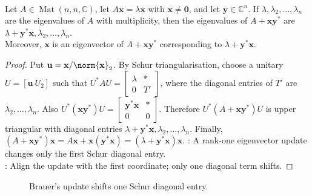 \begin{theorem} \label{thm:brauer-rank-one-eigenvalue-shift} \\
Let $A\in\operatorname{Mat}(n,n,\mathbb{C})$, let $A\mathbf{x}=\lambda\mathbf{x}$ with $\mathbf{x}\neq\mathbf{0}$, and let $\mathbf{y}\in\mathbb{C}^n$. If $\lambda,\lambda_2,\ldots,\lambda_n$ are the eigenvalues of $A$ with multiplicity, then the eigenvalues of $A+\mathbf{x}\mathbf{y}^*$ are $\lambda+\mathbf{y}^*\mathbf{x},\lambda_2,\ldots,\lambda_n$.\\
Moreover, $\mathbf{x}$ is an eigenvector of $A+\mathbf{x}\mathbf{y}^*$ corresponding to $\lambda+\mathbf{y}^*\mathbf{x}$.
\begin{proof}
Put $\mathbf{u}=\mathbf{x}/\norm{\mathbf{x}}_2$. By Schur triangularisation, choose a unitary $U=[\mathbf{u}\ U_2]$ such that $U^*AU=\begin{bmatrix}\lambda&*\\0&T'\end{bmatrix}$, where the diagonal entries of $T'$ are $\lambda_2,\ldots,\lambda_n$. Also $U^*(\mathbf{x}\mathbf{y}^*)U
=
\begin{bmatrix}
\mathbf{y}^*\mathbf{x}&*\\
0&0
\end{bmatrix}$.
Therefore $U^*(A+\mathbf{x}\mathbf{y}^*)U$ is upper triangular with diagonal entries $\lambda+\mathbf{y}^*\mathbf{x},\lambda_2,\ldots,\lambda_n$. Finally, $(A+\mathbf{x}\mathbf{y}^*)\mathbf{x}=A\mathbf{x}+\mathbf{x}(\mathbf{y}^*\mathbf{x})=(\lambda+\mathbf{y}^*\mathbf{x})\mathbf{x}$.
: A rank-one eigenvector update changes only the first Schur diagonal entry.\\
: Align the update with the first coordinate; only one diagonal term shifts.
\end{proof}
\end{theorem}

\begin{figure}[H]
  \centering
  
  \caption{Brauer's update shifts one Schur diagonal entry.}
  \label{fig:brauer-rank-one-shift}
\end{figure}

